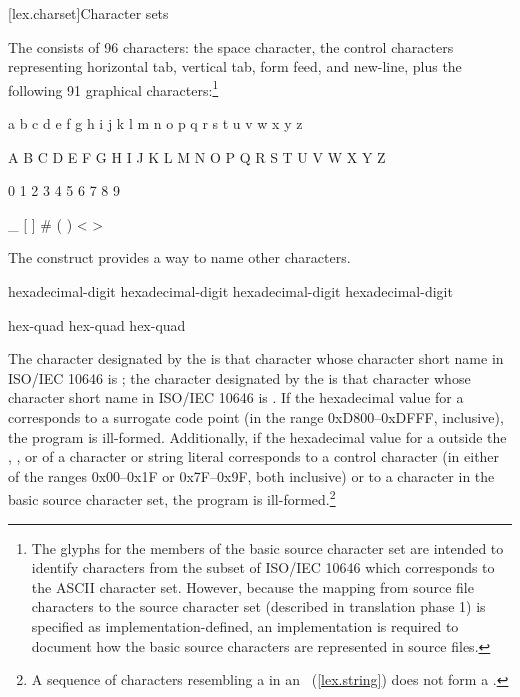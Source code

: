 [lex.charset]{Character sets}

\pnum
{}%
%
The  consists of 96 characters: the space character,
the control characters representing horizontal tab, vertical tab, form feed, and
new-line, plus the following 91 graphical characters:\footnote{The glyphs for
the members of the basic source character set are intended to
identify characters from the subset of ISO/IEC 10646 which corresponds to the ASCII
character set. However, because the mapping from source file characters to the source
character set (described in translation phase 1) is specified as implementation-defined,
an implementation is required to document how the basic source characters are
represented in source files.}

\begin{codeblock}
a b c d e f g h i j k l m n o p q r s t u v w x y z

A B C D E F G H I J K L M N O P Q R S T U V W X Y Z

0 1 2 3 4 5 6 7 8 9

_ { } [ ] # ( ) < > %
\end{codeblock}

\pnum
The  construct provides a way to name
other characters.

\begin{bnf}
\br
    hexadecimal-digit hexadecimal-digit hexadecimal-digit hexadecimal-digit
\end{bnf}

\begin{bnf}
\br
     hex-quad\br
     hex-quad hex-quad
\end{bnf}

The character designated by the   is that character whose character short name in ISO/IEC 10646 is
; the character designated by the 
 is that character whose character short name in
ISO/IEC 10646 is . If the hexadecimal value for a
 corresponds to a surrogate code point (in the
range 0xD800--0xDFFF, inclusive), the program is ill-formed. Additionally, if
the hexadecimal value for a  outside
the , , or
 of
a character or
string literal corresponds to a control character (in either of the
ranges 0x00--0x1F or 0x7F--0x9F, both inclusive) or to a character in the basic
source character set, the program is ill-formed.\footnote{A sequence of characters resembling a  in an
~(\ref{lex.string}) does not form a
.}

